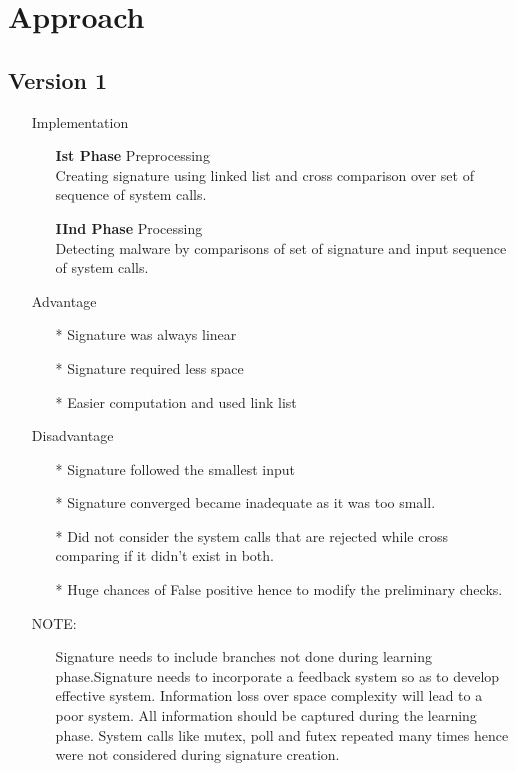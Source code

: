 \section{Approach}
\subsection{Version 1}
\begin{itemize}
    \item[] Implementation 
        \begin{itemize}
            \item[] \textbf{Ist Phase} Preprocessing \\ Creating signature using linked list and cross comparison over set of sequence of system calls.
            \item[] \textbf{IInd Phase} Processing \\ Detecting malware by comparisons of set of signature and input sequence of system calls.
        \end{itemize}
    \item[] {Advantage}
        \begin{itemize}
            \item[*] Signature was always linear
            \item[*] Signature required less space
            \item[*] Easier computation and used link list
        \end{itemize}
    \item[] {Disadvantage}
        \begin{itemize}     
            \item[*] Signature followed the smallest input
            \item[*] Signature converged became inadequate as it was too small.
            \item[*] Did not consider the system calls that are rejected while cross comparing if it didn't exist in both.
            \item[*] Huge chances of False positive hence to modify the preliminary checks.
        \end{itemize}
    \item[] {NOTE:}
        \begin{itemize}                                        
            \item[] Signature needs to include branches not done during learning phase.Signature needs to incorporate a feedback system so as to develop effective system. Information loss over space complexity will lead to a poor system. All information should be captured during the learning phase. System calls like mutex, poll and futex repeated many times hence were not considered during signature creation.
        \end{itemize}
\end{itemize}
